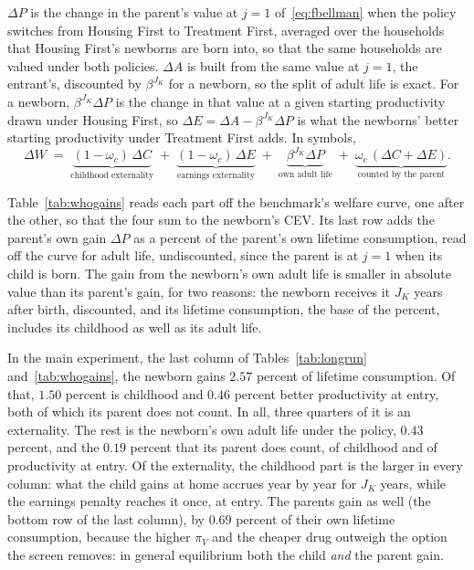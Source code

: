 \documentclass[10pt]{article}
\begin{document}
$\Delta P$ is the change in the parent's value at $j=1$ of~\eqref{eq:fbellman} when the policy switches from Housing First to Treatment First, averaged over the households that Housing First's newborns are born into, so that the same households are valued under both policies. $\Delta A$ is built from the same value at $j=1$, the entrant's, discounted by $\beta^{J_K}$ for a newborn, so the split of adult life is exact. For a newborn, $\beta^{J_K}\Delta P$ is the change in that value at a given starting productivity drawn under Housing First, so $\Delta E$$=\Delta A-\beta^{J_K}\Delta P$ is what the newborns' better starting productivity under Treatment First adds. In symbols,
\begin{equation}\label{eq:parts}
\Delta W\;=\;\underbrace{(1-\omega_c)\,\Delta C}_{\text{childhood externality}}\;+\;\underbrace{(1-\omega_c)\,\Delta E}_{\text{earnings externality}}\;+\;\underbrace{\beta^{J_K}\Delta P}_{\text{own adult life}}\;+\;\underbrace{\omega_c\,(\Delta C+\Delta E)}_{\text{counted by the parent}}.
\end{equation}

Table~\ref{tab:whogains} reads each part off the benchmark's welfare curve, one after the other, so that the four sum to the newborn's CEV. Its last row adds the parent's own gain $\Delta P$ as a percent of the parent's own lifetime consumption, read off the curve for adult life, undiscounted, since the parent is at $j=1$ when its child is born. The gain from the newborn's own adult life is smaller in absolute value than its parent's gain, for two reasons: the newborn receives it $J_K$ years after birth, discounted, and its lifetime consumption, the base of the percent, includes its childhood as well as its adult life.



In the main experiment, the last column of Tables~\ref{tab:longrun} and~\ref{tab:whogains}, the newborn gains $2.57$ percent of lifetime consumption. Of that, $1.50$ percent is childhood and $0.46$ percent better productivity at entry, both of which its parent does not count. In all, three quarters of it is an externality. The rest is the newborn's own adult life under the policy, $0.43$ percent, and the $0.19$ percent that its parent does count, of childhood and of productivity at entry. Of the externality, the childhood part is the larger in every column: what the child gains at home accrues year by year for $J_K$ years, while the earnings penalty reaches it once, at entry. The parents gain as well (the bottom row of the last column), by $0.69$ percent of their own lifetime consumption, because the higher $\pi_V$ and the cheaper drug outweigh the option the screen removes: in general equilibrium both the child \emph{and} the parent gain.
\end{document}
